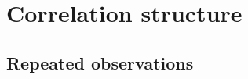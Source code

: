 \documentclass[10pt]{beamer}
\begin{document}
% 
% 
% 
% 

% 
% 
% 
% 


% 
% 
% 
% 
% 
% 

\section{Correlation structure} %

\subsection{Repeated observations} %
\end{document}
